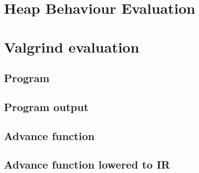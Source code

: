 
\section{Heap Behaviour Evaluation}\label{appendix:heap_behaviour}

\section{Valgrind evaluation}

\subsection{Program}\label{appendix:valgrind_program}

\subsection{Program output}\label{appendix:valgrind_output}

\subsection{Advance function}\label{appendix:advance_func}

\subsection{Advance function lowered to IR}\label{appendix:advance_ir}
